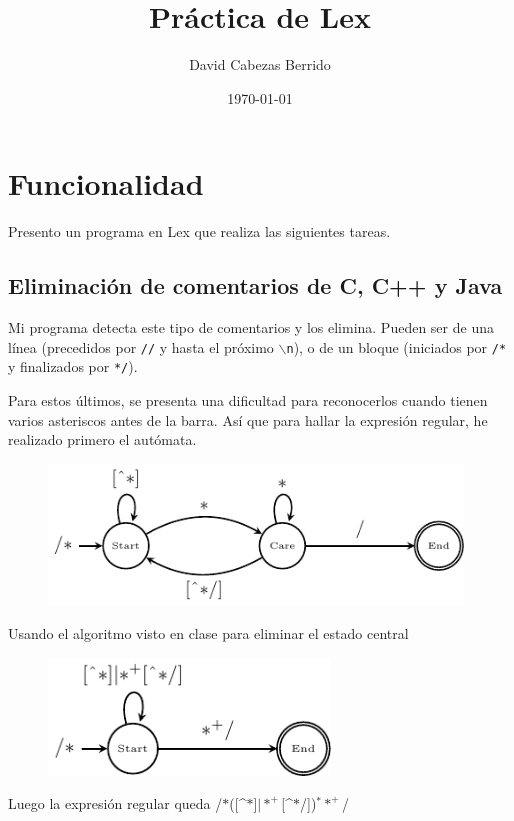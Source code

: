 \documentclass[10pt,a4paper]{article}
\title{Práctica de Lex}
\author{David Cabezas Berrido}
\date{\today}
\begin{document}
\maketitle

\section{Funcionalidad}
Presento un programa en Lex que realiza las siguientes tareas.

\subsection{Eliminación de comentarios de C, C++ y Java}

Mi programa detecta este tipo de comentarios y los elimina. Pueden ser
de una línea (precedidos por \texttt{//} y hasta el próximo
$\backslash$\texttt{n}), o de un bloque (iniciados por \texttt{/*} y finalizados
por \texttt{*/}).

Para estos últimos, se presenta una dificultad para reconocerlos
cuando tienen varios asteriscos antes de la barra. Así que para hallar
la expresión regular, he realizado primero el autómata.

\begin{figure}[H]
  \centering
  \includegraphics[width=110mm]{aut_comentarios}
\end{figure}

Usando el algoritmo visto en clase para eliminar el estado central

\begin{figure}[H]
  \centering
  \includegraphics[width=75mm]{aut_comentarios2}
\end{figure}

Luego la expresión regular queda
/$*$([\textasciicircum $*$]$|*^+$[\textasciicircum $*$/])$^**^+$/
\end{document}
